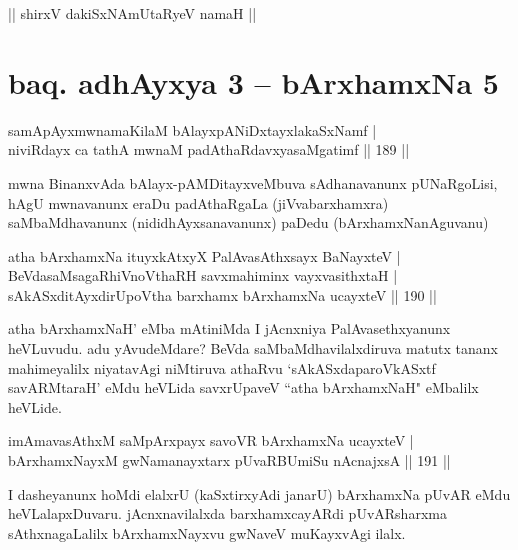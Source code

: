 \begin{center}
|| shirxV dakiSxNAmUtaRyeV namaH ||
\end{center}

\section*{baq. adhAyxya 3 -- bArxhamxNa 5}

\begin{shl}
samApAyxmwnamaKilaM bAlayxpANiDxtayxlakaSxNamf |\\
niviRdayx ca tathA mwnaM padAthaRdavxyasaMgatimf \hfill || 189 ||
\end{shl}

\begin{artha}%
mwna BinanxvAda bAlayx-pAMDitayxveMbuva sAdhanavanunx pUNaRgoLisi, hAgU mwnavanunx eraDu padAthaRgaLa (jiVvabarxhamxra) saMbaMdhavanunx (nididhAyxsanavanunx) paDedu (bArxhamxNanAguvanu)
\end{artha}


\begin{shl}
atha bArxhamxNa ituyxkAtxyX PalAvasAthx\s sayx BaNayxteV |\\
BeVdasaMsagaRhiVnoV\s thaRH savxmahiminx vayxvasithxtaH |\\
sAkASxditAyxdirUpoV\s tha barxhamx bArxhamxNa ucayxteV \hfill || 190 ||
\end{shl}

\begin{artha}
atha bArxhamxNaH' eMba mAtiniMda I jAcnxniya PalAvasethxyanunx heVLuvudu. adu yAvudeMdare? BeVda saMbaMdhavilalxdiruva matutx tananx mahimeyalilx niyatavAgi niMtiruva athaRvu `sAkASxdaparoVkASxtf savARMtaraH' eMdu heVLida savxrUpaveV ``atha bArxhamxNaH" eMbalilx heVLide.
\end{artha}


\begin{shl}
imAmavasAthxM saMpArxpayx savoVR bArxhamxNa ucayxteV |\\
bArxhamxNayxM gwNamanayxtarx pUvaRBUmiSu nAcnajxsA \hfill || 191 ||
\end{shl}

\begin{artha}
I dasheyanunx hoMdi elalxrU (kaSxtirxyAdi janarU) bArxhamxNa pUvAR eMdu heVLalapxDuvaru. jAcnxnavilalxda barxhamxcayARdi pUvARsharxma sAthxnagaLalilx bArxhamxNayxvu gwNaveV muKayxvAgi ilalx.
\end{artha}

